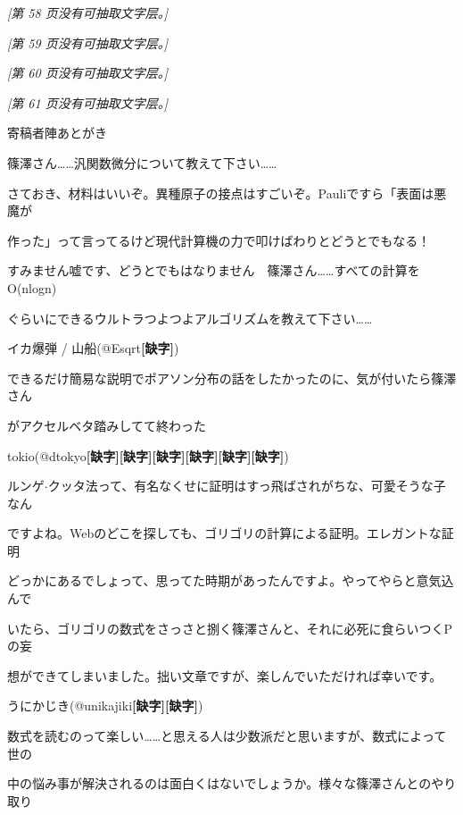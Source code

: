 \noindent\textit{[第 58 页没有可抽取文字层。]}\par

\noindent\textit{[第 59 页没有可抽取文字层。]}\par

\noindent\textit{[第 60 页没有可抽取文字层。]}\par

\noindent\textit{[第 61 页没有可抽取文字层。]}\par

寄稿者陣あとがき\par
篠澤さん……汎関数微分について教えて下さい……\par
さておき、材料はいいぞ。異種原子の接点はすごいぞ。Pauliですら「表面は悪魔が\par
作った」って言ってるけど現代計算機の力で叩けばわりとどうとでもなる！\par
すみません嘘です、どうとでもはなりません　篠澤さん……すべての計算をO(nlogn)\par
ぐらいにできるウルトラつよつよアルゴリズムを教えて下さい……\par
イカ爆弾 / 山船(@Esqrt\textbf{[缺字]})\par
できるだけ簡易な説明でポアソン分布の話をしたかったのに、気が付いたら篠澤さん\par
がアクセルベタ踏みしてて終わった\par
tokio(@dtokyo\textbf{[缺字]}\textbf{[缺字]}\textbf{[缺字]}\textbf{[缺字]}\textbf{[缺字]}\textbf{[缺字]})\par
ルンゲ$\cdot$クッタ法って、有名なくせに証明はすっ飛ばされがちな、可愛そうな子なん\par
ですよね。Webのどこを探しても、ゴリゴリの計算による証明。エレガントな証明\par
どっかにあるでしょって、思ってた時期があったんですよ。やってやらと意気込んで\par
いたら、ゴリゴリの数式をさっさと捌く篠澤さんと、それに必死に食らいつくPの妄\par
想ができてしまいました。拙い文章ですが、楽しんでいただければ幸いです。\par
うにかじき(@unikajiki\textbf{[缺字]}\textbf{[缺字]})\par
数式を読むのって楽しい……と思える人は少数派だと思いますが、数式によって世の\par
中の悩み事が解決されるのは面白くはないでしょうか。様々な篠澤さんとのやり取り\par
